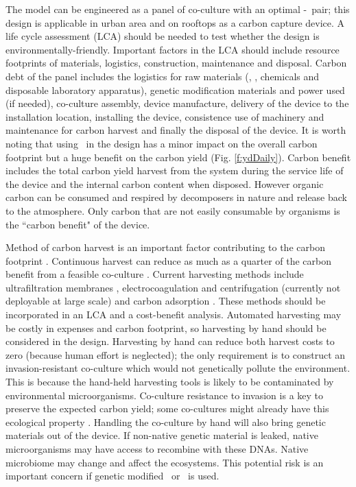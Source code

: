 \documentclass[env.tex]{subfiles}
\begin{document}
The model can be engineered as a panel of co-culture with an optimal \phy-\bacm\ pair; this design is applicable in urban area and on rooftops as a carbon capture device.  A life cycle assessment (LCA) should be needed to test whether the design is environmentally-friendly.  Important factors in the LCA should include resource footprints of materials, logistics, construction, maintenance and disposal.  Carbon debt of the panel includes the logistics for raw materials (\phy, \bac, chemicals and disposable laboratory apparatus), genetic modification materials and power used (if needed), co-culture assembly, device manufacture, delivery of the device to the installation location, installing the device, consistence use of machinery and maintenance for carbon harvest and finally the disposal of the device.  It is worth noting that using \bac\ in the design has a minor impact on the overall carbon footprint but a huge benefit on the carbon yield (Fig. \ref{f:ydDaily}).  Carbon benefit includes the total carbon yield harvest from the system during the service life of the device and the internal carbon content when disposed.  However organic carbon can be consumed and respired by decomposers in nature and release back to the atmosphere.  Only carbon that are not easily consumable by organisms is the ``carbon benefit" of the device.

Method of carbon harvest is an important factor contributing to the carbon footprint \autocite{fuentes2016impact}.  Continuous harvest can reduce as much as a quarter of the carbon benefit from a feasible co-culture \autocite{mata2010microalgae}.  Current harvesting methods include ultrafiltration membranes \autocite{zhang2010harvesting}, electrocoagulation and centrifugation (currently not deployable at large scale) \autocite{wijffels2010outlook} and carbon adsorption \autocite{mata2010microalgae,wang2012novel,lee2014repeated}.  These methods should be incorporated in an LCA and a cost-benefit analysis.  Automated harvesting may be costly in expenses and carbon footprint, so harvesting by hand should be considered in the design.  Harvesting by hand can reduce both harvest costs to zero (because human effort is neglected); the only requirement is to construct an invasion-resistant co-culture which would not genetically pollute the environment.  This is because the hand-held harvesting tools is likely to be contaminated by environmental microorganisms.  Co-culture resistance to invasion is a key to preserve the expected carbon yield; some co-cultures might already have this ecological property \autocite{fuentes2016impact,seyedsayamdost2011roseobacticides}.  Handling the co-culture by hand will also bring genetic materials out of the device.  If non-native genetic material is leaked, native microorganisms may have access to recombine with these DNAs.  Native microbiome may change and affect the ecosystems.  This potential risk is an important concern if genetic modified \phy\ or \bac\ is used.
\end{document}
